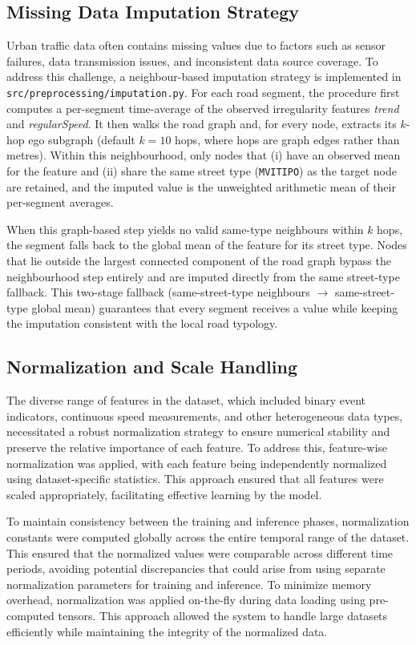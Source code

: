 \documentclass[11pt, a4paper]{article}
\begin{document}
\subsection{Missing Data Imputation Strategy}

Urban traffic data often contains missing values due to factors such as sensor failures, data transmission issues, and inconsistent data source coverage. To address this challenge, a neighbour-based imputation strategy is implemented in \texttt{src/preprocessing/imputation.py}. For each road segment, the procedure first computes a per-segment time-average of the observed irregularity features \textit{trend} and \textit{regularSpeed}. It then walks the road graph and, for every node, extracts its $k$-hop ego subgraph (default $k=10$ hops, where hops are graph edges rather than metres). Within this neighbourhood, only nodes that (i) have an observed mean for the feature and (ii) share the same street type (\texttt{MVITIPO}) as the target node are retained, and the imputed value is the unweighted arithmetic mean of their per-segment averages.

When this graph-based step yields no valid same-type neighbours within $k$ hops, the segment falls back to the global mean of the feature for its street type. Nodes that lie outside the largest connected component of the road graph bypass the neighbourhood step entirely and are imputed directly from the same street-type fallback. This two-stage fallback (same-street-type neighbours $\rightarrow$ same-street-type global mean) guarantees that every segment receives a value while keeping the imputation consistent with the local road typology.

\subsection{Normalization and Scale Handling}

The diverse range of features in the dataset, which included binary event indicators, continuous speed measurements, and other heterogeneous data types, necessitated a robust normalization strategy to ensure numerical stability and preserve the relative importance of each feature. To address this, feature-wise normalization was applied, with each feature being independently normalized using dataset-specific statistics. This approach ensured that all features were scaled appropriately, facilitating effective learning by the model.

To maintain consistency between the training and inference phases, normalization constants were computed globally across the entire temporal range of the dataset. This ensured that the normalized values were comparable across different time periods, avoiding potential discrepancies that could arise from using separate normalization parameters for training and inference. To minimize memory overhead, normalization was applied on-the-fly during data loading using pre-computed tensors. This approach allowed the system to handle large datasets efficiently while maintaining the integrity of the normalized data.
\end{document}
